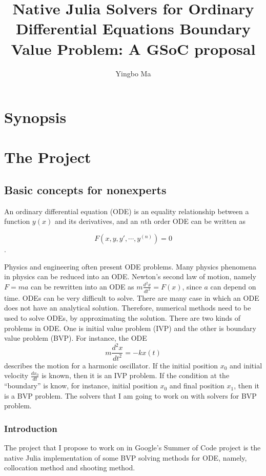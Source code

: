\documentclass[a4paper,12pt,onecolumn]{article}
\author{Yingbo Ma}
\title{Native Julia Solvers for Ordinary Differential Equations Boundary Value Problem: A GSoC proposal}
\begin{document}
\nocite{*}
\maketitle
\maketitle
\tableofcontents

\section{Synopsis} %
\label{sec:synopsis}


\section{The Project} %
\label{sec:the_project}

\subsection{Basic concepts for nonexperts} %
\label{sub:basic_concepts_for_nonexperts}
An ordinary differential equation (ODE)  is an equality relationship between a function $y(x)$
and its derivatives, and an $n$th order ODE can be written as

\[F(x, y, y', \cdots, y^{(n)}) = 0\].

Physics and engineering often present ODE problems. Many physics phenomena in physics can be reduced into an ODE. Newton's second law of motion, namely $F=ma$ can be rewritten into an ODE as $m\frac{d^2x}{dt^2}
=F(x)$, since $a$ can depend on time. ODEs can be very difficult to solve. There are many case in which an ODE does not have an analytical solution. Therefore, numerical methods need to be used to solve
ODEs, by approximating the solution. There are two kinds of problems in ODE. One is initial
value problem (IVP) and the other is boundary value problem (BVP). For instance, the ODE
\[m\frac{d^2x}{dt^2} = -kx(t)\]
describes the motion for a harmonic oscillator. If the initial position $x_0$ and initial velocity
$\frac{dx_0}{dt}$ is known, then it is an IVP problem. If the condition at the ``boundary'' is know,
for instance, initial position $x_0$ and final position $x_1$, then it is a BVP problem. The solvers
that I am going to work on with solvers for BVP problem.

\subsubsection{Introduction} %
\label{ssub:introduction}
The project that I propose to work on in Google's Summer of Code project is the native Julia
implementation of some BVP solving methods for ODE, namely, collocation method and shooting method.
\end{document}
